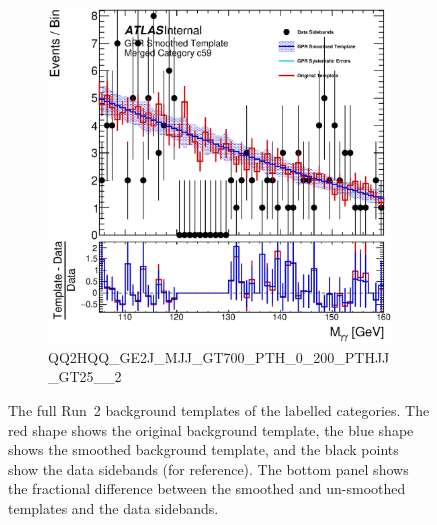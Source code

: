 \begin{figure}
\begin{center}
\begin{subfigure}[T]{0.49\linewidth}
	\centering
	\includegraphics[width=\linewidth]{figures/background/gpr/coupCatTemplates/GPR_Smoothed_Plot_hmgg_c59.eps}
	\caption{\tiny{QQ2HQQ\_GE2J\_MJJ\_GT700\_PTH\_0\_200\_PTHJJ\_GT25\_\_2}}
\end{subfigure}
\caption{The full Run~2 background templates of the labelled categories. The red shape shows the original background template, the blue shape shows the smoothed background template, and the black points show the data sidebands (for reference). The bottom panel shows the fractional difference between the smoothed and un-smoothed templates and the data sidebands. }
 \label{fig:gpr_coupcat_15}
 \end{center}
\end{figure}

